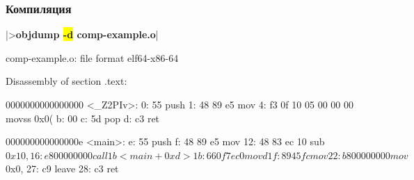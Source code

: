 \documentclass[compress]{beamer}
\newcommand{\shellprompt}{>}
\newcommand{\shellcommand}[1]{\shellprompt \space \textbf{#1}}
\begin{document}
\begin{frame}[fragile]

    \frametitle{Компиляция}

        \begin{ConsoleWindow}
|\shellcommand{objdump \colorbox{yellow}{-d} comp-example.o}|

comp-example.o:     file format elf64-x86-64


Disassembly of section .text:

0000000000000000 <_Z2PIv>:
   0:   55                      push   %
   1:   48 89 e5                mov    %
   4:   f3 0f 10 05 00 00 00    movss  0x0(%
   b:   00
   c:   5d                      pop    %
   d:   c3                      ret

000000000000000e <main>:
   e:   55                      push   %
   f:   48 89 e5                mov    %
  12:   48 83 ec 10             sub    $0x10,%
  16:   e8 00 00 00 00          call   1b <main+0xd>
  1b:   66 0f 7e c0             movd   %
  1f:   89 45 fc                mov    %
  22:   b8 00 00 00 00          mov    $0x0,%
  27:   c9                      leave
  28:   c3                      ret
        \end{ConsoleWindow}

    \centering

\end{frame}
\end{document}
